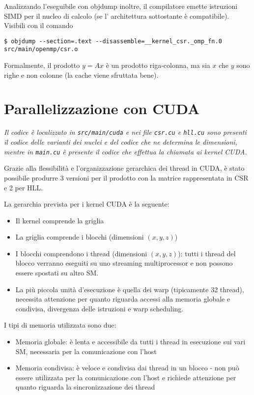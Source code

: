 \documentclass[a4paper,9pt]{extarticle}
\begin{document}
Analizzando l'eseguibile con objdump inoltre, il compilatore emette istruzioni SIMD per il nucleo di calcolo (se l'
architettura sottostante è compatibile). Visibili con il comando
\begin{lstlisting}
$ objdump --section=.text --disassemble=__kernel_csr._omp_fn.0 src/main/openmp/csr.o
\end{lstlisting}

Formalmente, il prodotto $y = Ax$ è un prodotto riga-colonna, ma sia $x$ che $y$ sono righe e non colonne (la cache
viene sfruttata bene).

\section{Parallelizzazione con CUDA}
\textit{Il codice è localizzato in \texttt{src/main/cuda} e nei file \texttt{csr.cu} e \texttt{hll.cu} sono presenti il
codice delle varianti dei nuclei e del codice che ne determina le dimensioni, mentre in \texttt{main.cu} è presente
il codice che effettua la chiamata ai kernel CUDA.}

Grazie alla flessibilità e l'organizzazione gerarchica dei thread in CUDA, è stato possibile produrre 3 versioni per il 
prodotto con la matrice rappresentata in CSR e 2 per HLL.

La gerarchia prevista per i kernel CUDA è la seguente:
\begin{itemize}
	\item Il kernel comprende la griglia
	\item La griglia comprende i blocchi (dimensioni $(x,y,z)$)
	\item I blocchi comprendono i thread (dimensioni $(x,y,z)$): 
	tutti i thread del blocco verranno eseguiti su uno streaming multiprocessor e non possono essere spostati su altro SM.
	\item La più piccola unità d'esecuzione è quella dei warp (tipicamente 32 thread), necessita attenzione per quanto
	riguarda accessi alla memoria globale e condivisa, divergenza delle istruzioni e warp scheduling.
\end{itemize}

I tipi di memoria utilizzata sono due:
\begin{itemize}
	\item Memoria globale: è lenta e accessibile da tutti i thread in esecuzione sui vari SM, necessaria per la
	comunicazione con l'host
	\item Memoria condivisa: è veloce e condivisa dai thread in un blocco - non può essere utilizzata per la comunicazione
	con l'host e richiede attenzione per quanto riguarda la sincronizzazione dei thread
\end{itemize}
	
\end{document}
